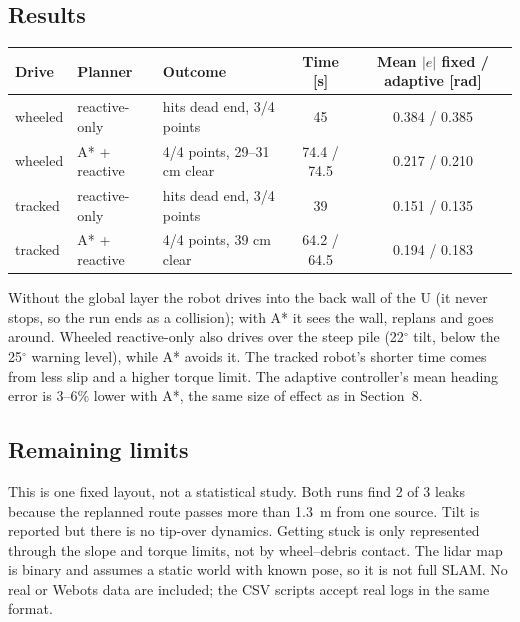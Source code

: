 \documentclass[11pt,a4paper]{article}
\begin{document}
\subsection{Results}
\begin{center}
\small\begin{tabular}{@{}lllcc@{}}
\toprule
Drive & Planner & Outcome & Time [s] & Mean $|e|$ fixed / adaptive [rad]\\
\midrule
wheeled & reactive-only & hits dead end, 3/4 points & 45 & 0.384 / 0.385\\
wheeled & A* + reactive & 4/4 points, 29--31 cm clear & 74.4 / 74.5 & 0.217 / 0.210\\
tracked & reactive-only & hits dead end, 3/4 points & 39 & 0.151 / 0.135\\
tracked & A* + reactive & 4/4 points, 39 cm clear & 64.2 / 64.5 & 0.194 / 0.183\\
\bottomrule
\end{tabular}
\end{center}
Without the global layer the robot drives into the back wall of the U (it never stops, so the run ends as a collision); with A* it sees the wall, replans and goes around. Wheeled reactive-only also drives over the steep pile (22$^\circ$ tilt, below the 25$^\circ$ warning level), while A* avoids it. The tracked robot's shorter time comes from less slip and a higher torque limit. The adaptive controller's mean heading error is 3--6\% lower with A*, the same size of effect as in Section~8.

\subsection{Remaining limits}
This is one fixed layout, not a statistical study. Both runs find 2 of 3 leaks because the replanned route passes more than 1.3~m from one source. Tilt is reported but there is no tip-over dynamics. Getting stuck is only represented through the slope and torque limits, not by wheel--debris contact. The lidar map is binary and assumes a static world with known pose, so it is not full SLAM. No real or Webots data are included; the CSV scripts accept real logs in the same format.
\end{document}
